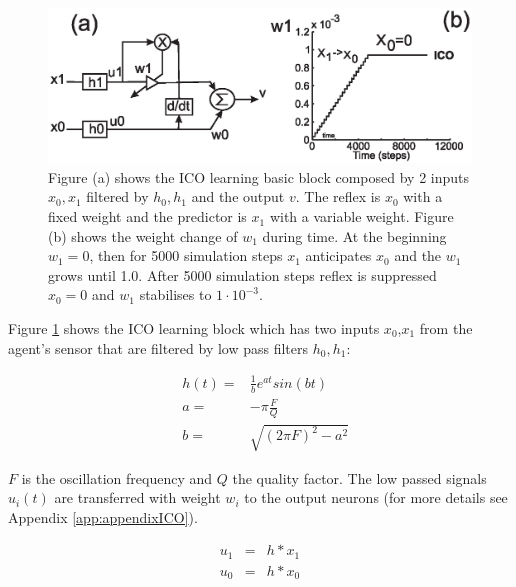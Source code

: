 \begin{figure}[htbp]
\begin{center}
\includegraphics[scale=0.5]{figures/socialadapt/ico.eps}
\caption[Agent learns with the ICO learning]{Figure (a) shows the ICO learning basic
block composed by 2 inputs $x_{0},x_{1}$ filtered by $h_{0},h_{1}$ and the output $v$.
The reflex is $x_{0}$ with a fixed weight and the predictor is $x_{1}$ with a variable weight.
Figure (b) shows the weight change of $w_{1}$ during time. At the beginning $w_{1}=0$,
then for 5000 simulation steps $x_{1}$ anticipates $x_{0}$ and the $w_{1}$ grows until 1.0.
After 5000 simulation steps reflex is suppressed $x_{0}=0$ and $w_{1}$ stabilises to $1 \cdot 10^{-3}$.
\label{fig:ico}}
\end{center}
\end{figure}

Figure \ref{fig:ico} shows the ICO learning block which has two inputs $x_{0}$,$x_{1}$
from the agent's sensor that are filtered by low pass filters $h_{0},h_{1}$:

\begin{eqnarray}
&h(t)=&\frac{1}{b}e^{at}sin(bt) \label{eq:1}\\
&a   =&-\pi \frac{F}{Q} \label{eq:F}\\
&b   =&\sqrt{(2\pi F)^2 -a^{2}} \label{eq:Q}
\end{eqnarray}

$F$ is the oscillation frequency and $Q$ the quality factor. The low passed
signals $u_{i}(t)$ are transferred with weight $w_{i}$ to the output
neurons (for more details see Appendix \ref{app:appendixICO}).

\begin{eqnarray}
u_1 &=& h \ast x_1 \\
u_0 &=& h \ast x_0
\end{eqnarray}

